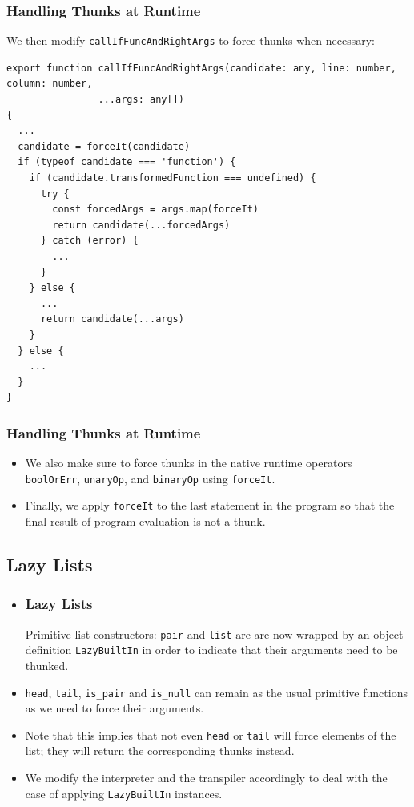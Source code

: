 \documentclass[12pt]{beamer}
\begin{document}
\begin{frame}[fragile]
\frametitle{Handling Thunks at Runtime}
We then modify \texttt{callIfFuncAndRightArgs} to force thunks when necessary:
\begin{lstlisting}
export function callIfFuncAndRightArgs(candidate: any, line: number, column: number, 
                ...args: any[])
{
  ...
  candidate = forceIt(candidate)
  if (typeof candidate === 'function') {
    if (candidate.transformedFunction === undefined) {
      try {
        const forcedArgs = args.map(forceIt)
        return candidate(...forcedArgs)
      } catch (error) {
        ...
      }
    } else {
      ...
      return candidate(...args)
    }
  } else {
    ...
  }
}
\end{lstlisting}
\end{frame}

\begin{frame}
\frametitle{Handling Thunks at Runtime}
\begin{itemize}
\item<1-> We also make sure to force thunks in the native runtime operators \texttt{boolOrErr}, \texttt{unaryOp}, and \texttt{binaryOp} using \texttt{forceIt}.
\item<2-> Finally, we apply \texttt{forceIt} to the last statement in the program so that the final result of program evaluation is not a thunk.
\end{itemize}
\end{frame}

\subsection{Lazy Lists}

\begin{frame}
\begin{itemize}
\item<1->\frametitle{Lazy Lists}
Primitive list constructors: \texttt{pair} and \texttt{list} are are now wrapped by an object definition \texttt{LazyBuiltIn} in order to indicate that their arguments need to be thunked.
\item<2-> \texttt{head}, \texttt{tail}, \texttt{is\_pair} and \texttt{is\_null} can remain as the usual primitive functions as we need to force their arguments.
\item<3->Note that this implies that not even \texttt{head} or \texttt{tail} will force elements of the list; they will return the corresponding thunks instead. 
\item<4->We modify the interpreter and the transpiler accordingly to deal with the case of applying \texttt{LazyBuiltIn} instances.
\end{itemize}
\end{frame}
\end{document}
